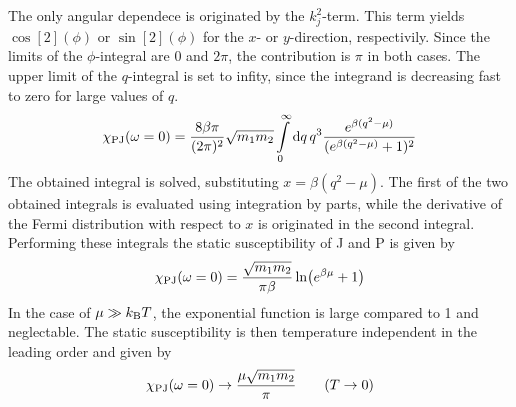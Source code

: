 The only angular dependece is originated by the $k_{j}^{2}$-term.
This term yields $\cos[2](\phi)$ or $\sin[2](\phi)$ for the $x$- or $y$-direction, respectivily.
Since the limits of the $\phi$-integral are $0$ and $2\pi$, the contribution is $\pi$ in both cases.
The upper limit of the $q$-integral is set to infity, since the integrand is decreasing fast to zero for large values of $q$.
%
\begin{align}
	\chi_{\mathrm{PJ}}(\omega = 0) = 
		\frac{8 \beta \pi}{(2\pi)^{2}} \sqrt{m_{1} m_{2}}
		\int\limits_{0}^{\infty} \dd{q}
		q^{3} \frac{e^{\beta(q^{2} - \mu)}}{(e^{\beta(q^{2} - \mu)} + 1)^{2}}
\end{align}
%
The obtained integral is solved, substituting $x = \beta(q^{2} - \mu)$.
The first of the two obtained integrals is evaluated using integration by parts, while the derivative of the Fermi distribution with respect to $x$ is originated in the second integral.
Performing these integrals the static susceptibility of J and P is given by
%
\begin{align}
	\chi_{\mathrm{PJ}}(\omega = 0) = \frac{\sqrt{m_{1} m_{2}}}{\pi \beta}\ln(e^{\beta \mu} + 1)
\end{align}
%
In the case of $\mu \gg k_{\mathrm{B}} T$, the exponential function is large compared to 1 and neglectable.
The static susceptibility is then temperature independent in the leading order and given by
%
\begin{align}
	\chi_{\mathrm{PJ}}(\omega = 0) \to \frac{\mu \sqrt{m_{1} m_{2}}}{\pi} \qquad (T \to 0)
\end{align}
%